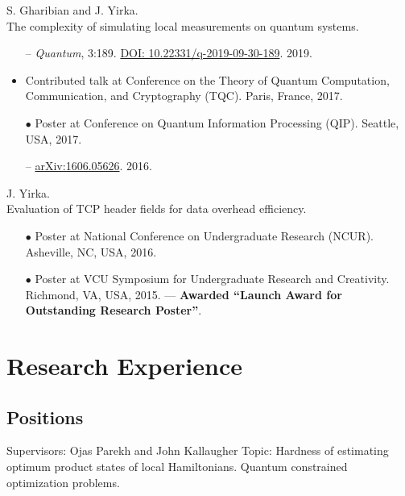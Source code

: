 \documentclass[11pt,letterpaper,serif]{moderncv}
\newcommand{\pubItemSep}{0em}
\begin{document}
S. Gharibian and J. Yirka.
\\The complexity of simulating local measurements on quantum systems.
\begin{adjustwidth}{.1in}{}
	\begin{itemize}[itemsep=\pubItemSep]
		\item[--] \textit{Quantum}, 3:189. \href{https://doi.org/10.22331/q-2019-09-30-189}{DOI: 10.22331/q-2019-09-30-189}. 2019.
		\item Contributed talk at Conference on the Theory of Quantum Computation, Communication,
		and Cryptography (TQC). Paris, France, 2017.
		\item[$\bullet$] Poster at Conference on Quantum Information Processing (QIP). Seattle, USA, 2017.
		\item[--] \href{https://arxiv.org/abs/1606.05626}{arXiv:1606.05626}. 2016.
	\end{itemize}
\end{adjustwidth}
\vspace{\parsep}

J. Yirka.
\\Evaluation of TCP header fields for data overhead efficiency.
\begin{adjustwidth}{.1in}{}
	\begin{itemize}[itemsep=\pubItemSep]
		\item[$\bullet$] Poster at National Conference on Undergraduate Research (NCUR). Asheville, NC, USA, 2016.
		\item[$\bullet$] Poster at VCU Symposium for Undergraduate Research and Creativity. Richmond, VA, USA, 2015. --- \textbf{Awarded ``Launch Award for Outstanding Research Poster''}.
	\end{itemize}
\end{adjustwidth}


\section{Research Experience}
\subsection{Positions}
{
	\begin{adjustwidth}{.25in}{}
		Supervisors: Ojas Parekh and John Kallaugher \newline
		Topic: Hardness of estimating optimum product states of local Hamiltonians. Quantum constrained optimization problems.
	\end{adjustwidth}
}
\end{document}
